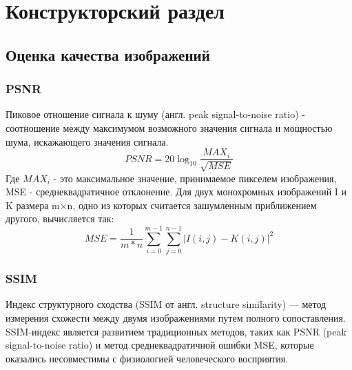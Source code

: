 \chapter{Конструкторский раздел}
\label{cha:design}
\section{Оценка качества изображений}
\subsection{PSNR}
Пиковое отношение сигнала к шуму (англ. peak signal-to-noise ratio) - соотношение между максимумом возможного значения сигнала и мощностью шума, искажающего значения сигнала.\cite{Habr1} 
\begin{equation}
PSNR=20\log_{10} \frac{MAX_i}{\sqrt{MSE}} 
\label{F:F1}
\end{equation}
Где $MAX_i$ - это максимальное значение, принимаемое пикселем изображения, MSE - среднеквадратичное отклонение.  Для двух монохромных изображений I и K размера m×n, одно из которых считается зашумленным приближением другого, вычисляется так:
\begin{equation}
MSE =\frac{1}{m*n}\sum_{i=0}^{m-1}\sum_{j=0}^{n-1}|I(i,j)-K(i,j)|^2
\label{F:F2}
\end{equation}
\subsection{SSIM}
Индекс структурного сходства (SSIM от англ. structure similarity) — метод измерения схожести между двумя изображениями путем полного сопоставления. SSIM-индекс является развитием традиционных методов, таких как PSNR (peak signal-to-noise ratio) и метод среднеквадратичной ошибки MSE, которые оказались несовместимы с физиологией человеческого восприятия.

